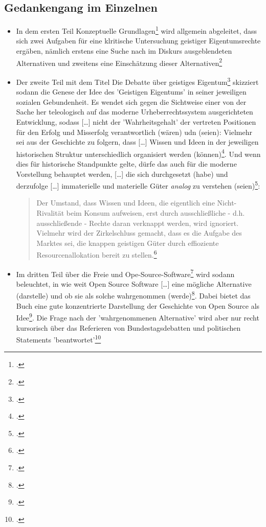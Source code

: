 \documentclass[DIV=calc,BCOR=5mm,11pt,headings=small,oneside,abstract=true, toc=bib]{scrartcl}
\begin{document}
\subsection{Gedankengang im Einzelnen}
\begin{itemize}
  \item In dem ersten Teil \glqq{}Konzeptuelle
  Grundlagen\grqq{}\footcite[vgl.][15ff]{Eckl2004a} wird allgemein abgeleitet,
  dass sich \glqq{}zwei Aufgaben für eine klritische Untersuchung
  geistiger Eigentumsrechte\grqq{} ergäben, nämlich \glqq{}erstens eine
  Suche nach im Diskurs ausgeblendeten Alternativen und zweitens eine
  Einschätzung dieser Alternativen\grqq{}\footcite[vgl.][43]{Eckl2004a}
  \item Der zweite Teil mit dem Titel \glqq{}Die Debatte über geistiges
  Eigentum\grqq{}\footcite[vgl.][45ff]{Eckl2004a} skizziert sodann die Genese
  der Idee des 'Geistigen Eigentums' in seiner jeweiligen sozialen Gebundenheit.
  Es wendet sich gegen die Sichtweise einer von der Sache her teleologisch auf
  das moderne \glqq{}Urheberrechtssystem\grqq{} ausgerichteten Entwicklung,
  sodass \glqq{}[\ldots] nicht der 'Wahrheitsgehalt' der vertreten Positionen
  für den Erfolg und Misserfolg verantwortlich (wären) udn (seien)\grqq{}:
  Vielmehr sei aus der Geschichte zu folgern, dass \glqq{}[\ldots] Wissen und
  Ideen in der jeweiligen historischen Struktur unterschiedlich organisiert
  werden (können)\grqq{}\footcite[vgl.][94]{Eckl2004a}. Und wenn dies für
  historische Standpunkte gelte, dürfe das auch für die moderne
  \glqq{}Vorstellung\grqq{} behauptet werden, \glqq{}[\ldots] die sich
  durchgesetzt (habe)\grqq{} und derzufolge \glqq{}[\ldots] immaterielle
  und materielle Güter \emph{analog} zu verstehen
  (seien)\grqq{}\footcite[vgl.][96, herv.i.O]{Eckl2004a}:
  \begin{quote} \glqq{}Der Umstand, dass Wissen und Ideen, die
  eigentlich eine Nicht-Rivalität beim Konsum aufweisen, erst durch
  ausschließliche - d.h. ausschließende - Rechte daran verknappt werden,
  wird ignoriert. Vielmehr wird der Zirkelschluss gemacht, dass es die
  Aufgabe des Marktes sei, die knappen geistigen Güter durch effioziente
  Resourcenallokation bereit zu stellen.\grqq{}\footcite[vgl.][96]{Eckl2004a}
  \end{quote}
  \item Im dritten Teil über die \glqq{}Freie und
  Ope-Source-Software\grqq{}\footcite[vgl.][101ff]{Eckl2004a} wird sodann
  beleuchtet, in wie weit Open Source Software \glqq{}[\ldots] eine
  mögliche Alternative (darstelle) und ob sie als solche wahrgenommen
  (werde)\grqq{}\footcite[vgl.][99]{Eckl2004a}. Dabei bietet das Buch eine gute
  konzentrierte Darstellung der Geschichte von Open Source als
  Idee\footcite[vgl.][102]{Eckl2004a}. Die Frage nach der 'wahrgenommenen
  Alternative' wird aber nur recht kursorisch über das Referieren von
  Bundestagsdebatten und politischen Statements
  'beantwortet'\footcite[vgl.][118ff]{Eckl2004a}
\end{itemize}
\end{document}
